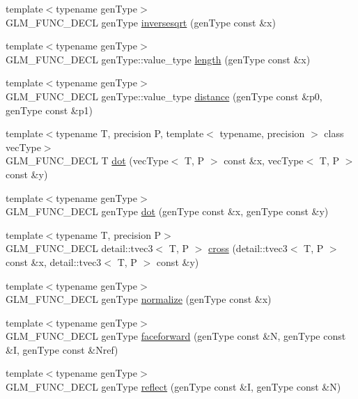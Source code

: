 \begin{CompactItemize}
\item 
{\footnotesize template$<$typename genType$>$ }\\GLM\_\-FUNC\_\-DECL genType \hyperlink{group__core__func__exponential_ga190c750b7eefaeb15431987d41177d1}{inversesqrt} (genType const \&x)
\item 
{\footnotesize template$<$typename genType$>$ }\\GLM\_\-FUNC\_\-DECL genType::value\_\-type \hyperlink{group__core__func__geometric_gd73a94d9c967e619e670156356e93b7e}{length} (genType const \&x)
\item 
{\footnotesize template$<$typename genType$>$ }\\GLM\_\-FUNC\_\-DECL genType::value\_\-type \hyperlink{group__core__func__geometric_gd21e00cab9f8b4eb6d1214a16dee06c7}{distance} (genType const \&p0, genType const \&p1)
\item 
{\footnotesize template$<$typename T, precision P, template$<$ typename, precision $>$ class vecType$>$ }\\GLM\_\-FUNC\_\-DECL T \hyperlink{group__core__func__geometric_gc64a3b29d01336161a668d328cac97eb}{dot} (vecType$<$ T, P $>$ const \&x, vecType$<$ T, P $>$ const \&y)
\item 
{\footnotesize template$<$typename genType$>$ }\\GLM\_\-FUNC\_\-DECL genType \hyperlink{group__core__func__geometric_g93acafc6005a3433ccf1dc3fa4230d51}{dot} (genType const \&x, genType const \&y)
\item 
{\footnotesize template$<$typename T, precision P$>$ }\\GLM\_\-FUNC\_\-DECL detail::tvec3$<$ T, P $>$ \hyperlink{group__core__func__geometric_g9a325364ff3650c4a85c33704c646e76}{cross} (detail::tvec3$<$ T, P $>$ const \&x, detail::tvec3$<$ T, P $>$ const \&y)
\item 
{\footnotesize template$<$typename genType$>$ }\\GLM\_\-FUNC\_\-DECL genType \hyperlink{group__core__func__geometric_g0feb2bb89ee2743677ad2cb84544bd83}{normalize} (genType const \&x)
\item 
{\footnotesize template$<$typename genType$>$ }\\GLM\_\-FUNC\_\-DECL genType \hyperlink{group__core__func__geometric_ga4cdf87f6fd660e7086776d9abb6cbae}{faceforward} (genType const \&N, genType const \&I, genType const \&Nref)
\item 
{\footnotesize template$<$typename genType$>$ }\\GLM\_\-FUNC\_\-DECL genType \hyperlink{group__core__func__geometric_gc973ce2bc49f749a469d3ed2e2ac5a54}{reflect} (genType const \&I, genType const \&N)

\end{CompactItemize}

